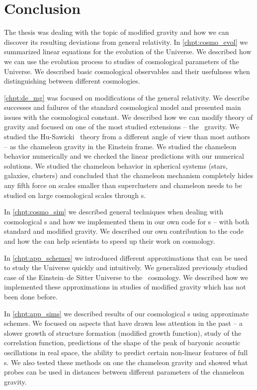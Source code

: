 \chapter*{Conclusion}
The thesis was dealing with the topic of modified gravity and how we can discover its resulting deviations from general relativity. In \autoref{chpt:cosmo_evol} we summarized linear equations for the evolution of the Universe. We described how we can use the evolution process to studies of cosmological parameters of the Universe. We described basic cosmological observables and their usefulness when distinguishing between different cosmologies.

\autoref{chpt:de_mg} was focused on modifications of the general relativity. We describe successes and failures of the standard cosmological model and presented main issues with the cosmological constant. We described how we can modify theory of gravity and focused on one of the most studied extensions -- the \fR\ gravity. We studied the Hu-Sawicki \fR\ theory from a different angle of view than most authors -- as the chameleon gravity in the Einstein frame. We studied the chameleon behavior numerically and we checked the linear predictions with our numerical solutions. We studied the chameleon behavior in spherical systems (stars, galaxies, clusters) and concluded that the chameleon mechanism completely hides any fifth force on scales smaller than superclusters and chameleon needs to be studied on large cosmological scales through \nbodysim s. 

In \autoref{chpt:cosmo_sim} we described general techniques when dealing with cosmological \nbodysim s and how we implemented them in our own code for \nbodysim s -- with both standard and modified gravity. We described our own contribution to the  code and how the  can help scientists to speed up their work on cosmology.

In \autoref{chpt:app_schemes} we introduced different approximations that can be used to study the Universe quickly and intuitively. We generalized previously studied case of the Einstein--de Sitter Universe to the \LCDM\ cosmology. We described how we implemented these approximations in studies of modified gravity which has not been done before.

In \autoref{chpt:app_sims} we described results of our cosmological \nbodysim s using approximate schemes. We focused on aspects that have drawn less attention in the past -- a slower growth of structure formation (modified growth function), study of the correlation function, predictions of the shape of the peak of baryonic acoustic oscillations in real space, the ability to predict certain non-linear features of full \nbody s. We also tested these methods on one the chameleon gravity and showed what probes can be used in distances between different parameters of the chameleon gravity.

